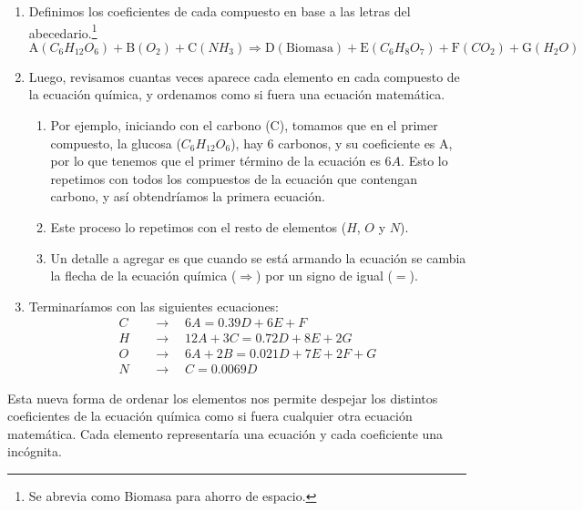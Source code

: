 \begin{enumerate}
    
    \item Definimos los coeficientes de cada compuesto en base a las letras del abecedario.\footnote{Se abrevia como Biomasa para ahorro de espacio.}
        \begin{equation*}
            \text{A}(C_{6}H_{12}O_{6}) + \text{B}(O_{2}) + \text{C}(NH_{3}) \Longrightarrow \text{D}(\text{Biomasa}) + \text{E}(C_{6}H_{8}O_{7}) + \text{F}(CO_{2}) + \text{G}(H_{2}O)
        \end{equation*}

    \item Luego, revisamos cuantas veces aparece cada elemento en cada compuesto de la ecuación química, y ordenamos como si fuera una ecuación matemática.
        \begin{enumerate}
	        \item Por ejemplo, iniciando con el carbono (C), tomamos que en el primer compuesto, la glucosa ($C_{6}H_{12}O_{6}$), hay 6 carbonos, y su coeficiente es A, por lo que tenemos que el primer término de la ecuación es $6A$. Esto lo repetimos con todos los compuestos de la ecuación que contengan carbono, y así obtendríamos la primera ecuación.
	        \item Este proceso lo repetimos con el resto de elementos ($H$, $O$ y $N$).
	        \item Un detalle a agregar es que cuando se está armando la ecuación se cambia la flecha de la ecuación química ($\Longrightarrow$) por un signo de igual ($=$).
        \end{enumerate}

    \item Terminaríamos con las siguientes ecuaciones:
        \begin{align*}
            C \quad &\longrightarrow \quad 6A = 0.39D + 6E + F
            \\
            H \quad &\longrightarrow \quad 12A + 3C = 0.72D + 8E + 2G
            \\
            O \quad &\longrightarrow \quad 6A + 2B = 0.021D + 7E + 2F + G
            \\
            N \quad &\longrightarrow \quad C = 0.0069D
        \end{align*}
\end{enumerate}

Esta nueva forma de ordenar los elementos nos permite despejar los distintos coeficientes de la ecuación química como si fuera cualquier otra ecuación matemática. Cada elemento representaría una ecuación y cada coeficiente una incógnita.

